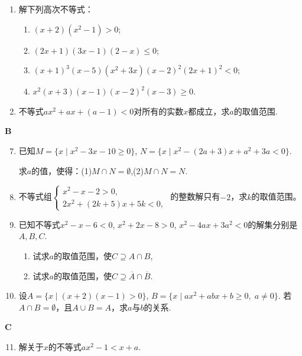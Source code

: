 \begin{enumerate}
\item 解下列高次不等式：
\begin{enumerate}[(1)]
    \item $(x+2)(x^{2}-1)>0$;
    \item $(2x+1)(3x-1)(2-x)\leq 0$;
    \item $(x+1)^{3}(x-5)(x^{2}+3x)(x-2)^{2}(2x+1)^{2}<0$;
    \item $x^{2}(x+3)(x-1)(x-2)^{2}(x-3)\ge 0$.
\end{enumerate}

\item 不等式$ax^2+ax+(a-1)<0$对所有的实数$x$都成立，求$a$的取值范围.
\end{enumerate}

\begin{center}
    \bfseries B
\end{center}

\begin{enumerate}\setcounter{enumi}{6}
    \item 已知$M= \{ x\mid x^{2}- 3x- 10\ge 0\} $,
    $N=\{x\mid x^{2}-(2a+3)x+a^{2}+3a<0\}$.

    求$a$的值，使得：(1)$M\cap N=\emptyset$,\qquad (2)$M\cap N=N$.
    
    \item  不等式组$\begin{cases}x^{2}-x-2>0,\\2x^{2}+(2k+5)x+5k<0,\end{cases}$
    的整数解只有$-2$，求$k$的取值范围。
    
    \item  已知不等式$x^{2}-x-6<0$, $x^{2}+2x-8>0$, $x^{2}-4ax+3a^{2}<0$的解集分别是$A,B,C$.
    \begin{enumerate}[(1)]
        \item 试求$a$的取值范围，使$C\supseteq A\cap B$,
        \item 试求$a$的取值范围，使$C\supseteq \overline{A}\cap \overline{B}$.
    \end{enumerate}
    \item 设$A=\{x\mid (x+2)(x-1)>0\}$, $B=\{x\mid ax^2+abx+b\ge 0, \; a\ne 0\}$. 若$A\cap B=\emptyset$，且$A\cup B=A$，求$a$与$b$的关系.
\end{enumerate}

\begin{center}
    \bfseries C
\end{center}

\begin{enumerate}\setcounter{enumi}{10}
    \item 解关于$x$的不等式$ax^2-1<x+a$.
\end{enumerate}

